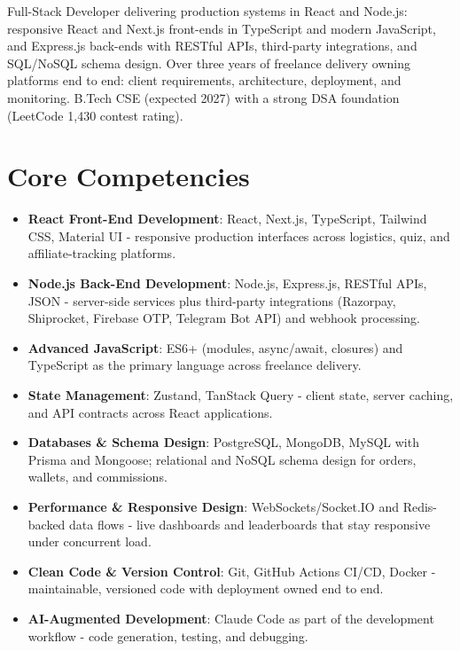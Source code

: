 \documentclass[11pt,a4paper,sans]{moderncv}
\begin{document}
\makecvtitle


\vspace{6pt}
\small{Full-Stack Developer delivering production systems in React and Node.js: responsive React and Next.js front-ends in TypeScript and modern JavaScript, and Express.js back-ends with RESTful APIs, third-party integrations, and SQL/NoSQL schema design. Over three years of freelance delivery owning platforms end to end: client requirements, architecture, deployment, and monitoring. B.Tech CSE (expected 2027) with a strong DSA foundation (LeetCode 1,430 contest rating).}


\section{Core Competencies}
\vspace{1pt}
\begin{itemize}

\item \textbf{React Front-End Development}: React, Next.js, TypeScript, Tailwind CSS, Material UI - responsive production interfaces across logistics, quiz, and affiliate-tracking platforms.

\item \textbf{Node.js Back-End Development}: Node.js, Express.js, RESTful APIs, JSON - server-side services plus third-party integrations (Razorpay, Shiprocket, Firebase OTP, Telegram Bot API) and webhook processing.

\item \textbf{Advanced JavaScript}: ES6+ (modules, async/await, closures) and TypeScript as the primary language across freelance delivery.

\item \textbf{State Management}: Zustand, TanStack Query - client state, server caching, and API contracts across React applications.

\item \textbf{Databases \& Schema Design}: PostgreSQL, MongoDB, MySQL with Prisma and Mongoose; relational and NoSQL schema design for orders, wallets, and commissions.

\item \textbf{Performance \& Responsive Design}: WebSockets/Socket.IO and Redis-backed data flows - live dashboards and leaderboards that stay responsive under concurrent load.

\item \textbf{Clean Code \& Version Control}: Git, GitHub Actions CI/CD, Docker - maintainable, versioned code with deployment owned end to end.

\item \textbf{AI-Augmented Development}: Claude Code as part of the development workflow - code generation, testing, and debugging.

\end{itemize}
\end{document}
